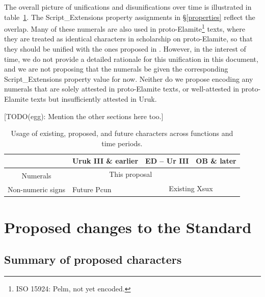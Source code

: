 \documentclass[10pt, a4paper, twoside]{article}
\begin{document}
The overall picture of unifications and disunifications over time is illustrated in table~\ref{tableUnificationsDisunifications}.
The Script\_Extensions property assignments in §\ref{properties} reflect the overlap.
Many of these numerals are also used in proto-Elamite\footnote{ISO 15924: Pelm, not yet encoded.} texts,
where they are treated as identical characters in scholarship on proto-Elamite,
so that they should be unified with the ones proposed in \cite{L2/23-196}.
However, in the interest of time, we do not provide a detailed rationale for this unification in this document,
and we are not proposing that the numerals be given the corresponding Script\_Extensions property value for now.
Neither do we propose encoding any numerals that are solely attested in proto-Elamite texts,
or well-attested in proto-Elamite texts but insufficiently attested in Uruk.

[TODO(egg): Mention the other sections here too.]

\begin{table}[htbp]
\begin{center}
\begin{tabular}{ l | l | l | l |} \cline{2-4}
                                                & Uruk III \& earlier & ED – Ur III                         & OB \& later    \\\hline
\multicolumn{1}{|c|}{\multirow{2}{*}{Numerals}} & \multicolumn{2}{|c|}{This proposal}                       &                \\\cline{2-4}
\multicolumn{1}{|c|}{}                          &                     & \multicolumn{2}{|c|}{\multirow{2}{*}{Existing Xsux}} \\\cline{1-2}
\multicolumn{1}{|c|}{Non-numeric signs}         & Future Pcun         & \multicolumn{2}{|c|}{}                               \\\hline
\end{tabular}
\caption{Usage of existing, proposed, and future characters across functions and time periods.}
\end{center}
\label{tableUnificationsDisunifications}
\end{table}

\section{Proposed changes to the Standard}
\label{proposal}
\subsection{Summary of proposed characters}
\end{document}
